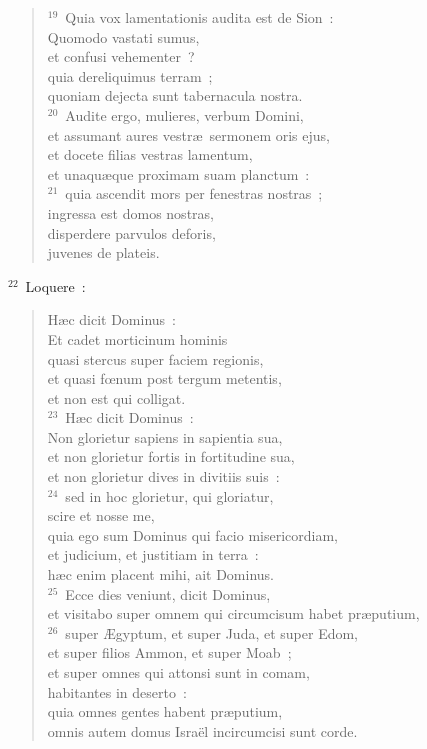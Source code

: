 \begin{flushleft}
\begin{verse}
${}^{19}$~Quia vox lamentationis audita est de Sion~:\\ Quomodo vastati sumus,\\ et confusi vehementer~?\\ quia dereliquimus terram~;\\ quoniam dejecta sunt tabernacula nostra.\\
${}^{20}$~Audite ergo, mulieres, verbum Domini,\\ et assumant aures vestr\ae\ sermonem oris ejus,\\ et docete filias vestras lamentum,\\ et unaqu\ae que proximam suam planctum~:\\
${}^{21}$~quia ascendit mors per fenestras nostras~;\\ ingressa est domos nostras,\\ disperdere parvulos deforis,\\ juvenes de plateis.\end{verse}\end{flushleft}


${}^{22}$~Loquere~: \begin{flushleft}\begin{verse}H\ae c dicit Dominus~:\\ Et cadet morticinum hominis\\ quasi stercus super faciem regionis,\\ et quasi fœnum post tergum metentis,\\ et non est qui colligat.\\
${}^{23}$~H\ae c dicit Dominus~:\\ Non glorietur sapiens in sapientia sua,\\ et non glorietur fortis in fortitudine sua,\\ et non glorietur dives in divitiis suis~:\\
${}^{24}$~sed in hoc glorietur, qui gloriatur,\\ scire et nosse me,\\ quia ego sum Dominus qui facio misericordiam,\\ et judicium, et justitiam in terra~:\\ h\ae c enim placent mihi, ait Dominus.\\
${}^{25}$~Ecce dies veniunt, dicit Dominus,\\ et visitabo super omnem qui circumcisum habet pr\ae putium,\\
${}^{26}$~super \AE gyptum, et super Juda, et super Edom,\\ et super filios Ammon, et super Moab~;\\ et super omnes qui attonsi sunt in comam,\\ habitantes in deserto~:\\ quia omnes gentes habent pr\ae putium,\\ omnis autem domus Isra\"el incircumcisi sunt corde.\end{verse}\end{flushleft}



